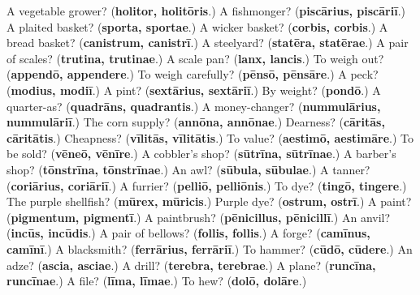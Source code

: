 \begin{tcolorbox}[breakable,colback=teal!4,colframe=teal!35!black,title={Before you move on}]
A vegetable grower? (\textbf{holitor, holitōris}.) A fishmonger? (\textbf{piscārius, piscāriī}.) A plaited basket? (\textbf{sporta, sportae}.) A wicker basket? (\textbf{corbis, corbis}.) A bread basket? (\textbf{canistrum, canistrī}.) A steelyard? (\textbf{statēra, statērae}.) A pair of scales? (\textbf{trutina, trutinae}.) A scale pan? (\textbf{lanx, lancis}.) To weigh out? (\textbf{appendō, appendere}.) To weigh carefully? (\textbf{pēnsō, pēnsāre}.) A peck? (\textbf{modius, modiī}.) A pint? (\textbf{sextārius, sextāriī}.) By weight? (\textbf{pondō}.) A quarter-as? (\textbf{quadrāns, quadrantis}.) A money-changer? (\textbf{nummulārius, nummulāriī}.) The corn supply? (\textbf{annōna, annōnae}.) Dearness? (\textbf{cāritās, cāritātis}.) Cheapness? (\textbf{vīlitās, vīlitātis}.) To value? (\textbf{aestimō, aestimāre}.) To be sold? (\textbf{vēneō, vēnīre}.) A cobbler's shop? (\textbf{sūtrīna, sūtrīnae}.) A barber's shop? (\textbf{tōnstrīna, tōnstrīnae}.) An awl? (\textbf{sūbula, sūbulae}.) A tanner? (\textbf{coriārius, coriāriī}.) A furrier? (\textbf{pelliō, pelliōnis}.) To dye? (\textbf{tingō, tingere}.) The purple shellfish? (\textbf{mūrex, mūricis}.) Purple dye? (\textbf{ostrum, ostrī}.) A paint? (\textbf{pigmentum, pigmentī}.) A paintbrush? (\textbf{pēnicillus, pēnicillī}.) An anvil? (\textbf{incūs, incūdis}.) A pair of bellows? (\textbf{follis, follis}.) A forge? (\textbf{camīnus, camīnī}.) A blacksmith? (\textbf{ferrārius, ferrāriī}.) To hammer? (\textbf{cūdō, cūdere}.) An adze? (\textbf{ascia, asciae}.) A drill? (\textbf{terebra, terebrae}.) A plane? (\textbf{runcīna, runcīnae}.) A file? (\textbf{līma, līmae}.) To hew? (\textbf{dolō, dolāre}.)
\end{tcolorbox}
